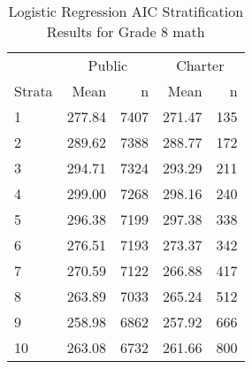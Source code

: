 \begin{table}[ht]
\centering
\caption{Logistic Regression AIC Stratification Results for Grade 8 math} 
\label{g8math-circpsa10AIC}
\begin{tabular}{lrr@{\extracolsep{.2cm}}rr}
  \hline
   & \multicolumn{2}{c}{Public} & \multicolumn{2}{c}{Charter} \\ \cline{2-3} \cline{4-5} Strata & Mean & n & Mean & n \\ \hline
1 & 277.84 & 7407 & 271.47 & 135 \\ 
  2 & 289.62 & 7388 & 288.77 & 172 \\ 
  3 & 294.71 & 7324 & 293.29 & 211 \\ 
  4 & 299.00 & 7268 & 298.16 & 240 \\ 
  5 & 296.38 & 7199 & 297.38 & 338 \\ 
  6 & 276.51 & 7193 & 273.37 & 342 \\ 
  7 & 270.59 & 7122 & 266.88 & 417 \\ 
  8 & 263.89 & 7033 & 265.24 & 512 \\ 
  9 & 258.98 & 6862 & 257.92 & 666 \\ 
  10 & 263.08 & 6732 & 261.66 & 800 \\ 
   \hline
\end{tabular}
\end{table}
